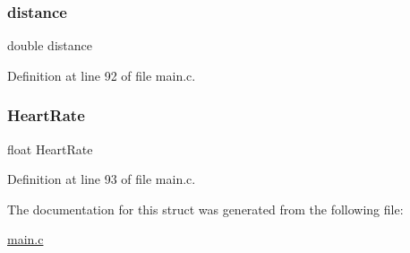 \subsubsection{\texorpdfstring{distance}{distance}}
{\footnotesize\ttfamily double distance}



Definition at line 92 of file main.\+c.

\mbox{\label{struct_main_process_data___a19546b530c18a3d4bba8eafbb4778f69}} 
\subsubsection{\texorpdfstring{Heart\+Rate}{HeartRate}}
{\footnotesize\ttfamily float Heart\+Rate}



Definition at line 93 of file main.\+c.



The documentation for this struct was generated from the following file\+:\begin{DoxyCompactItemize}
\item 
\mbox{\hyperlink{main_8c}{main.\+c}}\end{DoxyCompactItemize}
